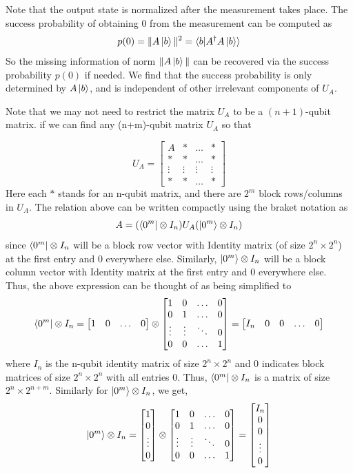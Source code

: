 \documentclass[12pt, oneside]{book}
\theoremstyle{definition}
\theoremstyle{definition}
\theoremstyle{remark}
\begin{document}
Note that the output state is normalized after the measurement takes place. The success probability of obtaining 0 from the measurement can be computed as
\[
p(0)=\|A\ket{b}\|^2=\braket{b|A^{\dagger}A\ket{b}}
\]
So the missing information of norm $\|A\ket{b}\|$ can be recovered via the success probability $p(0)$ if needed. We find that the success probability is only determined by $A\ket{b}$, and is independent of other irrelevant components of $U_A$.

Note that we may not need to restrict the matrix $U_A$ to be a $(n+1)$-qubit  matrix. if we can find any (n+m)-qubit matrix $U_A$ so that

\[
U_A=\begin{bmatrix} A & * & \ldots & * \\
* & * & \ldots & * \\
\vdots & \vdots & \vdots & \vdots \\
* & * & \ldots & * \end{bmatrix}
\]
Here each $*$ stands for an n-qubit matrix, and there are $2^m$ block rows/columns in $U_A$. The relation above can be written compactly using the braket notation as
\[
A=(\bra{0^m}\otimes I_n)U_A(\ket{0^m}\otimes I_n)
\]
since $\bra{0^m}\otimes I_n$ will be a block row vector with Identity matrix (of size $2^n \times 2^n$) at the first entry and 0 everywhere else. Similarly, $\ket{0^m} \otimes I_n$ will be a block column vector with Identity matrix at the first entry and 0 everywhere else. Thus, the above expression can be thought of as being simplified to
\[
\bra{0^m}\otimes I_n=\begin{bmatrix} 1 & 0 & \ldots & 0\end{bmatrix} \otimes \begin{bmatrix} 1 & 0 & \ldots & 0 \\ 0 & 1 & \ldots & 0 \\ \vdots & \vdots & \ddots & 0 \\ 0 & 0 & \ldots & 1 \end{bmatrix}=\begin{bmatrix} I_n & 0 & 0 & \ldots & 0 \end{bmatrix}
\]
where $I_n$ is the n-qubit identity matrix of size $2^n\times 2^n$ and $0$ indicates block matrices of size $2^n \times 2^n$ with all entries 0. Thus, $\bra{0^m}\otimes I_n$ is a matrix of size $2^n \times 2^{n+m}$. Similarly for $\ket{0^m} \otimes I_n$, we get,
\[
\ket{0^m}\otimes I_n=\begin{bmatrix} 1 \\ 0 \\ \vdots \\ 0\end{bmatrix} \otimes \begin{bmatrix} 1 & 0 & \ldots & 0 \\ 0 & 1 & \ldots & 0 \\ \vdots & \vdots & \ddots & 0 \\ 0 & 0 & \ldots & 1 \end{bmatrix}=\begin{bmatrix} I_n \\ 0 \\ 0 \\ \vdots \\ 0 \end{bmatrix}
\]
\end{document}
